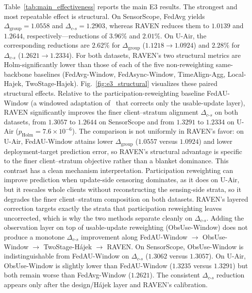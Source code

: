 \documentclass[letterpaper,journal]{IEEEtran}
\begin{document}
Table~\ref{tab:main_effectiveness} reports the main E3 results.  The strongest
and most repeatable effect is structural.  On SensorScope, FedAvg yields
$\Delta_{\mathrm{group}}=1.0558$ and
$\Delta_{c\text{-}s}=1.2903$, whereas RAVEN reduces them to $1.0139$ and
$1.2644$, respectively---reductions of $3.96\%$ and $2.01\%$.  On U-Air,
the corresponding reductions are $2.62\%$ for
$\Delta_{\mathrm{group}}$ ($1.1218\rightarrow1.0924$) and $2.28\%$ for
$\Delta_{c\text{-}s}$ ($1.2621\rightarrow1.2334$).
For both datasets, RAVEN's two structural metrics are Holm-significantly lower
than those of each of the five non-reweighting same-backbone baselines
(FedAvg-Window, FedAsync-Window, TimeAlign-Agg, Local-Hajek, TwoStage-Hajek).  Fig.~\ref{fig:e3_structural}
visualizes these paired structural effects.  Relative to the
participation-reweighting baseline FedAU-Window (a windowed adaptation
of~\cite{wang2024lightweight} that corrects only the usable-update layer),
RAVEN significantly improves the finer client--stratum alignment
$\Delta_{c\text{-}s}$ on both datasets, from $1.3057$ to $1.2644$ on SensorScope
and from $1.3291$ to $1.2334$ on U-Air ($p_{\mathrm{Holm}}=7.6\times10^{-6}$).
The comparison is not uniformly in RAVEN's favor: on U-Air, FedAU-Window attains
lower $\Delta_{\mathrm{group}}$ ($1.0557$ versus $1.0924$) and lower
deployment-target prediction error, so RAVEN's structural advantage is specific
to the finer client--stratum objective rather than a blanket dominance.
This contrast has a clean mechanism interpretation.  Participation reweighting
can improve prediction when update-side censoring dominates, as it does on
U-Air, but it rescales whole clients without reconstructing the sensing-side
strata, so it degrades the finer client--stratum composition on both datasets.
RAVEN's layered correction targets exactly the strata that participation
reweighting leaves uncorrected, which is why the two methods separate cleanly
on $\Delta_{c\text{-}s}$.
Adding the observation layer on top of usable-update reweighting
(ObsUse-Window) does not produce a monotone $\Delta_{c\text{-}s}$ improvement
along FedAU-Window $\rightarrow$ ObsUse-Window $\rightarrow$ TwoStage-H\'ajek
$\rightarrow$ RAVEN.  On SensorScope, ObsUse-Window is indistinguishable from
FedAU-Window on $\Delta_{c\text{-}s}$ ($1.3062$ versus $1.3057$).  On U-Air,
ObsUse-Window is slightly lower than FedAU-Window ($1.3235$ versus $1.3291$)
but both remain worse than FedAvg-Window ($1.2621$).  The consistent
$\Delta_{c\text{-}s}$ reduction appears only after the design/H\'ajek layer
and RAVEN's calibration.
\end{document}
